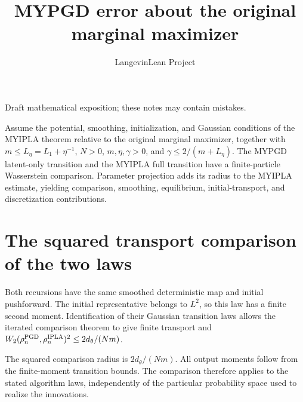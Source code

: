 \documentclass[11pt,a4paper]{article}
\title{\texorpdfstring{MYPGD error about the original marginal maximizer}{MYPGD error about the original marginal maximizer}}
\author{LangevinLean Project}
\date{}
\begin{document}
\maketitle
Draft mathematical exposition; these notes may contain mistakes.


Assume the potential, smoothing, initialization, and Gaussian conditions of the MYIPLA theorem relative to the original marginal maximizer, together with \(m\le L_\eta=L_1+\eta^{-1}\), \(N>0\), \(m,\eta,\gamma>0\), and \(\gamma\le2/(m+L_\eta)\). The MYPGD latent-only transition and the MYIPLA full transition have a finite-particle Wasserstein comparison. Parameter projection adds its radius to the MYIPLA estimate, yielding comparison, smoothing, equilibrium, initial-transport, and discretization contributions.


\section{\texorpdfstring{The squared transport comparison of the two laws}{The squared transport comparison of the two laws}}


Both recursions have the same smoothed deterministic map and initial pushforward. The initial representative belongs to \(L^2\), so this law has a finite second moment. Identification of their Gaussian transition laws allows the iterated comparison theorem to give finite transport and \(W_2(\rho_n^{\rm PGD},\rho_n^{\rm IPLA})^2\le2d_\theta/(Nm)\).



The squared comparison radius is \(2d_\theta/(Nm)\). All output moments follow from the finite-moment transition bounds. The comparison therefore applies to the stated algorithm laws, independently of the particular probability space used to realize the innovations.
\end{document}
